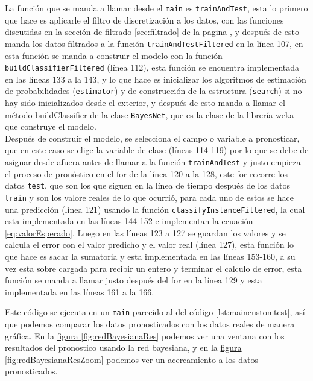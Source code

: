 La función que se manda a llamar desde el \texttt{main} es \texttt{trainAndTest}, esta lo primero que hace es aplicarle el filtro de discretización a los datos, con las funciones discutidas en la sección de \hyperref[sec:filtrado]{ filtrado \ref{sec:filtrado}} de la pagina \pageref{sec:filtrado}, y después de esto manda los datos filtrados a la función \texttt{trainAndTestFiltered} en la línea 107, en esta función se manda a construir el modelo con la función \texttt{buildClassifierFiltered} (línea 112), esta función se encuentra implementada en las líneas 133 a la 143, y lo que hace es inicializar los algoritmos de estimación de probabilidades (\texttt{estimator}) y de construcción de la estructura (\texttt{search}) si no hay sido inicializados desde el exterior, y después de esto manda a llamar el método buildClassifier de la clase \texttt{BayesNet}, que es la clase de la librería weka que construye el modelo.\\
Después de construir el modelo, se selecciona el campo o variable a pronosticar, que en este caso se elige la variable de clase (líneas 114-119) por lo que se debe de asignar desde afuera antes de llamar a la función \texttt{trainAndTest} y justo empieza el proceso de pronóstico en el for de la línea 120 a la 128, este for recorre los datos \texttt{test}, que son los que siguen en la línea de tiempo después de los datos \texttt{train} y son los valore reales de lo que ocurrió, para cada uno de estos se hace una predicción (línea 121) usando la función \texttt{classifyInstanceFiltered}, la cual esta implementada en las líneas 144-152 e implementan la ecuación \ref{eq:valorEsperado}. Luego en las líneas 123 a 127 se guardan los valores y se calcula el error con el valor predicho y el valor real (línea 127), esta función lo que hace es sacar la sumatoria y esta implementada en las líneas 153-160, a su vez esta sobre cargada para recibir un entero y terminar el calculo de error, esta función se manda a llamar justo después del for en la línea 129 y esta implementada en las líneas 161 a la 166.

Este código se ejecuta en un \texttt{main} parecido al del \hyperref[lst:maincustomtest]{ código \ref{lst:maincustomtest}}, así que podemos comparar los datos pronosticados con los datos reales de manera gráfica. En la  \hyperref[fig:redBayesianaRes]{ figura \ref{fig:redBayesianaRes}} podemos ver una ventana con los resultados del pronostico usando la red bayesiana, y en la \hyperref[fig:redBayesianaResZoom]{ figura \ref{fig:redBayesianaResZoom}} podemos ver un acercamiento a los datos pronosticados.

